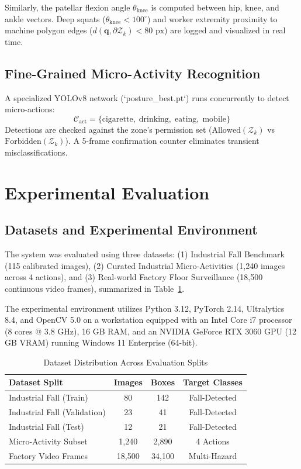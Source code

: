 \documentclass[conference]{IEEEtran}
\begin{document}
Similarly, the patellar flexion angle $\theta_{\text{knee}}$ is computed between hip, knee, and ankle vectors. Deep squats ($\theta_{\text{knee}} < 100^\circ$) and worker extremity proximity to machine polygon edges ($d(\mathbf{q}, \partial \mathcal{Z}_k) < 80\text{ px}$) are logged and visualized in real time.

\subsection{Fine-Grained Micro-Activity Recognition}
A specialized YOLOv8 network (`posture\_best.pt`) runs concurrently to detect micro-actions:
\begin{equation}
\mathcal{C}_{\text{act}} = \{\text{cigarette}, \; \text{drinking}, \; \text{eating}, \; \text{mobile}\}
\end{equation}
Detections are checked against the zone's permission set ($\text{Allowed}(\mathcal{Z}_k)$ vs $\text{Forbidden}(\mathcal{Z}_k)$). A 5-frame confirmation counter eliminates transient misclassifications.

\section{Experimental Evaluation}

\subsection{Datasets and Experimental Environment}
The system was evaluated using three datasets: (1) Industrial Fall Benchmark (115 calibrated images), (2) Curated Industrial Micro-Activities (1,240 images across 4 actions), and (3) Real-world Factory Floor Surveillance (18,500 continuous video frames), summarized in Table~\ref{tab:datasets}.

The experimental environment utilizes Python 3.12, PyTorch 2.14, Ultralytics 8.4, and OpenCV 5.0 on a workstation equipped with an Intel Core i7 processor (8 cores @ 3.8 GHz), 16 GB RAM, and an NVIDIA GeForce RTX 3060 GPU (12 GB VRAM) running Windows 11 Enterprise (64-bit).

\begin{table}[htbp]
\caption{Dataset Distribution Across Evaluation Splits}
\begin{center}
\begin{tabular}{lccc}
\toprule
\textbf{Dataset Split} & \textbf{Images} & \textbf{Boxes} & \textbf{Target Classes} \\
\midrule
Industrial Fall (Train) & 80 & 142 & Fall-Detected \\
Industrial Fall (Validation) & 23 & 41 & Fall-Detected \\
Industrial Fall (Test) & 12 & 21 & Fall-Detected \\
Micro-Activity Subset & 1,240 & 2,890 & 4 Actions \\
Factory Video Frames & 18,500 & 34,100 & Multi-Hazard \\
\bottomrule
\end{tabular}
\label{tab:datasets}
\end{center}
\end{table}
\end{document}
